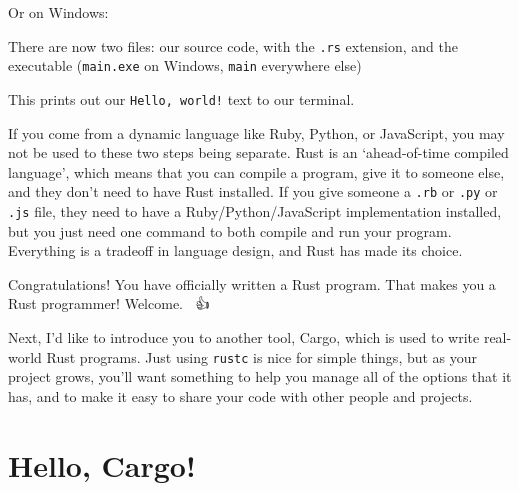 \documentclass[a4paper,]{book}
\newenvironment{Shaded}{\begin{snugshade}}{\end{snugshade}}
\newcommand{\KeywordTok}[1]{\textcolor[rgb]{0.13,0.29,0.53}{\textbf{{#1}}}}
\newcommand{\CommentTok}[1]{\textcolor[rgb]{0.56,0.35,0.01}{\textit{{#1}}}}
\newcommand{\NormalTok}[1]{{#1}}
\begin{document}
\begin{Shaded}
\end{Shaded}

Or on Windows:

\begin{Shaded}
\end{Shaded}

There are now two files: our source code, with the \texttt{.rs}
extension, and the executable (\texttt{main.exe} on Windows,
\texttt{main} everywhere else)

\begin{Shaded}
\end{Shaded}

This prints out our \texttt{Hello,\ world!} text to our terminal.

If you come from a dynamic language like Ruby, Python, or JavaScript,
you may not be used to these two steps being separate. Rust is an
`ahead-of-time compiled language', which means that you can compile a
program, give it to someone else, and they don't need to have Rust
installed. If you give someone a \texttt{.rb} or \texttt{.py} or
\texttt{.js} file, they need to have a Ruby/Python/JavaScript
implementation installed, but you just need one command to both compile
and run your program. Everything is a tradeoff in language design, and
Rust has made its choice.

Congratulations! You have officially written a Rust program. That makes
you a Rust programmer! Welcome. 🎊🎉👍

Next, I'd like to introduce you to another tool, Cargo, which is used to
write real-world Rust programs. Just using \texttt{rustc} is nice for
simple things, but as your project grows, you'll want something to help
you manage all of the options that it has, and to make it easy to share
your code with other people and projects.

\section{Hello, Cargo!}\label{sec--hello-cargo}
\end{document}
